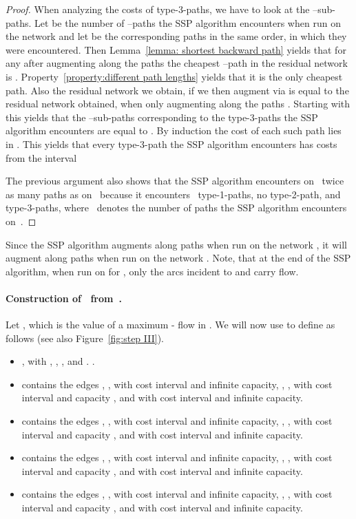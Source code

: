 \documentclass[11pt]{article}
\begin{document}
\begin{proof}
When analyzing the costs of type-3-paths, we have to look at the --sub-paths.
Let  be the number of --paths the SSP algorithm encounters when
run on the network  and let  be the corresponding paths
in the same order, in which they were encountered.
Then Lemma~\ref{lemma: shortest backward path} yields that for any  after augmenting along the paths  the cheapest
--path in the residual network is . Property~\ref{property:different path lengths} yields that it is the only cheapest path. Also
the residual network we obtain, if we then augment via
 is equal to the residual network obtained, when
only augmenting along the paths . Starting with  this
yields that the --sub-paths corresponding to the type-3-paths the SSP
algorithm encounters are equal to
.
By induction the cost of each such path  lies in . This
yields that every type-3-path the SSP algorithm encounters has costs from the interval


The previous argument also shows that the SSP algorithm encounters on~ twice as many paths as on~
because it encounters~ type-1-paths, no type-2-path, and~ type-3-paths, where~ denotes the
number of paths the SSP algorithm encounters on~. 
\end{proof}

Since the SSP algorithm augments along  paths when run on the network , it will augment along  paths when run on the network .
Note, that at the end of the SSP algorithm, when run on  for , only the  arcs incident to  and  carry flow. 


\paragraph{Construction of~ from~.}
Let , which is the value of a maximum - flow in . We will now use  to define  as follows
(see also Figure~\ref{fig:step III}).
\begin{itemize}
\setlength{\itemsep}{0cm}
\item , with , , , and . .\newline
\item  contains the edges , , with cost interval  and infinite capacity,
, , with cost interval  and capacity , and  with cost interval  and infinite capacity.\newline
\item  contains the edges , , with cost interval  and infinite capacity,
, , with cost interval  and capacity , and  with cost interval  and infinite capacity.\newline
\item  contains the edges , , with cost interval  and infinite capacity,
, , with cost interval  and capacity , and  with cost interval  and infinite capacity.\newline
\item  contains the edges , , with cost interval  and infinite capacity,
, , with cost interval  and capacity , and  with cost interval  and infinite capacity.
\end{itemize}
\end{document}
